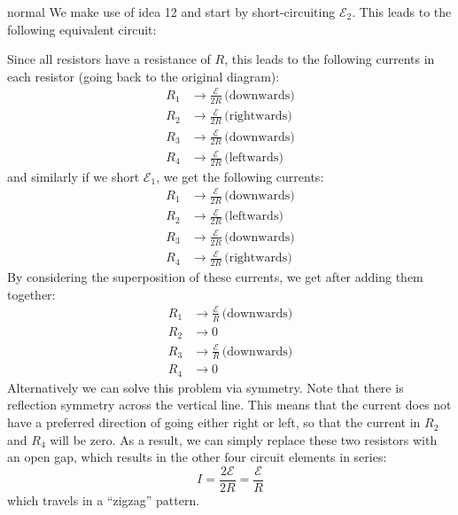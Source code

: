 \begin{solution}{normal}
We make use of idea 12 and start by short-circuiting $\mathcal{E}_2$. This leads to the following equivalent circuit:
\begin{center}
\end{center}
Since all resistors have a resistance of $R$, this leads to the following currents in each resistor (going back to the original diagram):
\begin{align*}
    R_1 &\rightarrow \frac{\mathcal{E}}{2R} \, \text{(downwards)} \\ 
    R_2 &\rightarrow \frac{\mathcal{E}}{2R} \, \text{(rightwards)} \\ 
    R_3 &\rightarrow \frac{\mathcal{E}}{2R} \, \text{(downwards)} \\
    R_4 &\rightarrow \frac{\mathcal{E}}{2R} \, \text{(leftwards)}
\end{align*}
and similarly if we short $\mathcal{E}_1$, we get the following currents:
\begin{align*}
    R_1 &\rightarrow \frac{\mathcal{E}}{2R} \, \text{(downwards)} \\ 
    R_2 &\rightarrow \frac{\mathcal{E}}{2R} \, \text{(leftwards)} \\ 
    R_3 &\rightarrow \frac{\mathcal{E}}{2R} \, \text{(downwards)} \\
    R_4 &\rightarrow \frac{\mathcal{E}}{2R} \, \text{(rightwards)}
\end{align*}
By considering the superposition of these currents, we get after adding them together:
\begin{align*}
    R_1 &\rightarrow \frac{\mathcal{E}}{R} \, \text{(downwards)} \\ 
    R_2 &\rightarrow 0 \\ 
    R_3 &\rightarrow \frac{\mathcal{E}}{R} \, \text{(downwards)} \\
    R_4 &\rightarrow 0
\end{align*}
\tcbline
Alternatively we can solve this problem via symmetry. Note that there is reflection symmetry across the vertical line. This means that the current does not have a preferred direction of going either right or left, so that the current in $R_2$ and $R_4$ will be zero. As a result, we can simply replace these two resistors with an open gap, which results in the other four circuit elements in series:
$$    I = \frac{2\mathcal{E}}{2R} = \frac{\mathcal{E}}{R}
$$
which travels in a ``zigzag'' pattern.
\end{solution}